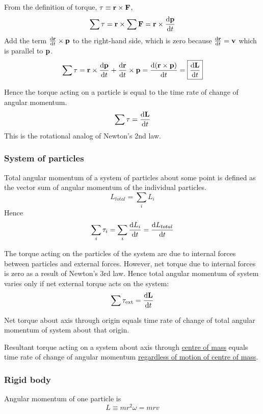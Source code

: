 \begin{derivation}
From the definition of torque, $\vb{\tau} \equiv \vb{r}\times\vb{F}$,
\[ \sum\vb{\tau} = \vb{r}\times\sum\vb{F} = \vb{r}\times\odv{\vb{p}}{t} \]
Add the term $\odv{\vb{r}}{t}\times\vb{p}$ to the right-hand side, which is zero because $\odv{\vb{r}}{t}=\vb{v}$ which is parallel to $\vb{p}$.
\[ \sum\vb{\tau} = \vb{r}\times\odv{\vb{p}}{t} + \dv{\vb{r}}{t}\times\vb{p} = \dv{(\vb{r}\times\vb{p})}{t} = \boxed{\dv{\vb{L}}{t}} \]
\end{derivation}

Hence the torque acting on a particle is equal to the time rate of change of angular momentum.
\begin{equation}
\sum\mathbf{\tau} = \dv{\vb{L}}{t}
\end{equation}
This is the rotational analog of Newton's 2nd law.

\subsubsection{System of particles}
Total angular momentum of a system of particles about some point is defined as the vector sum of angular momentum of the individual particles.
\[ L_{total} = \sum_i L_i \]
Hence
\[ \sum_i \tau_i = \sum_i \odv{L_i}{t} = \odv{L_{total}}{t} \]

The torque acting on the particles of the system are due to internal forces between particles and external forces. However, net torque due to internal forces is zero as a result of Newton's 3rd law. Hence total angular momentum of system varies only if net external torque acts on the system:
\begin{equation}
\sum\mathbf{\tau}_\text{ext} = \dv{\vb{L}}{t}
\end{equation}

Net torque about axis through origin equals time rate of change of total angular momentum of system about that origin.

\begin{thrm}{}{}
Resultant torque acting on a system about axis through \underline{centre of mass} equals time rate of change of angular momentum \underline{regardless of motion of centre of mass}.
\end{thrm}

\subsubsection{Rigid body}
Angular momentum of one particle is
\begin{equation}
L \equiv mr^2\omega = mrv
\end{equation}

